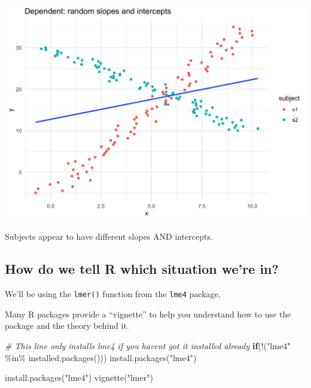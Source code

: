 \documentclass[
  openany]{book}
\newenvironment{Shaded}{\begin{snugshade}}{\end{snugshade}}
\newcommand{\CommentTok}[1]{\textcolor[rgb]{0.56,0.35,0.01}{\textit{#1}}}
\newcommand{\ControlFlowTok}[1]{\textcolor[rgb]{0.13,0.29,0.53}{\textbf{#1}}}
\newcommand{\FunctionTok}[1]{\textcolor[rgb]{0.00,0.00,0.00}{#1}}
\newcommand{\NormalTok}[1]{#1}
\newcommand{\SpecialCharTok}[1]{\textcolor[rgb]{0.00,0.00,0.00}{#1}}
\newcommand{\StringTok}[1]{\textcolor[rgb]{0.31,0.60,0.02}{#1}}
\begin{document}
\begin{center}\includegraphics[width=1\linewidth]{images/m3/rand_slope_int} \end{center}

Subjects appear to have different slopes AND intercepts.

\hypertarget{how-do-we-tell-r-which-situation-were-in}{%
\subsection{How do we tell R which situation we're in?}\label{how-do-we-tell-r-which-situation-were-in}}

We'll be using the \texttt{lmer()} function from the \texttt{lme4} package.

Many R packages provide a ``vignette'' to help you understand how to use the package and the theory behind it.

\begin{Shaded}
\begin{Highlighting}[]
\CommentTok{\# This line only installs lme4 if you haven\textquotesingle{}t got it installed already}
\ControlFlowTok{if}\NormalTok{(}\SpecialCharTok{!}\NormalTok{(}\StringTok{"lme4"} \SpecialCharTok{\%in\%} \FunctionTok{installed.packages}\NormalTok{())) }\FunctionTok{install.packages}\NormalTok{(}\StringTok{"lme4"}\NormalTok{)}

\FunctionTok{install.packages}\NormalTok{(}\StringTok{"lme4"}\NormalTok{)}
\FunctionTok{vignette}\NormalTok{(}\StringTok{"lmer"}\NormalTok{)}
\end{Highlighting}
\end{Shaded}
\end{document}
